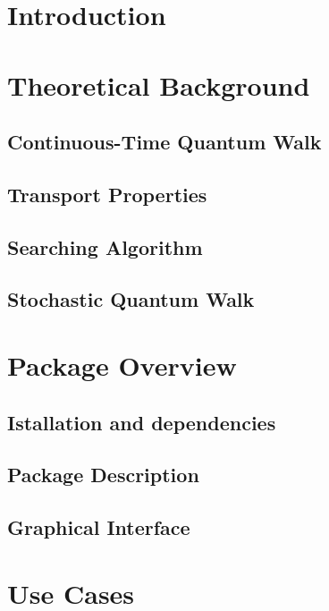 \documentclass[preprint,12pt]{elsarticle}
\begin{document}
\section{Introduction}
    


\section{Theoretical Background}\label{sec:theor_background}
    
    \subsection{Continuous-Time Quantum Walk}
        
    \subsection{Transport Properties}
        
        
    \subsection{Searching Algorithm}
        \label{sec:theor_searching}
    \subsection{Stochastic Quantum Walk}
        

\section{Package Overview}\label{sec:pack_overview}
    
    \subsection{Istallation and dependencies}
        
    \subsection{Package Description}
        \label{sec:OverviewDescription}
    \subsection{Graphical Interface}
        

\section{Use Cases}\label{sec:use_cases}
    
\end{document}
